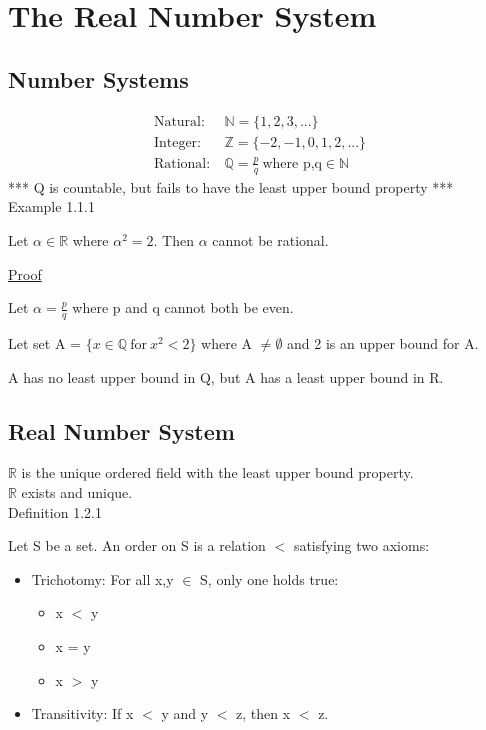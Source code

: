 \newpage
\section[Day 1: The Real Number System]{The Real Number System}





\subsection{Number Systems}

\begin{align*}
	\text{Natural}:\ & \mathbb{N} = \{1, 2, 3, ... \} \\
	\text{Integer}:\ & \mathbb{Z} = \{-2, -1, 0, 1, 2, ... \} \\
	\text{Rational}:\ & \mathbb{Q} = \frac{p}{q} \ \text{where p,q} \in \mathbb{N}
\end{align*}
*** Q is countable, but fails to have the least upper bound property *** \\

{ \color{purple} Example 1.1.1 }

\qquad Let $ \alpha \in \mathbb{R} $ where $ \alpha^2 = 2 $. Then $ \alpha $ cannot be rational.

{ \color{magenta} \underline{Proof} }

Let $ \alpha = \frac{p}{q} $ where p and q cannot both be even.

Let set A = $\{ x \in \mathbb{Q} \ \text{for} \ x^2 < 2 \} $ where A $ \neq \emptyset $
and 2 is an upper bound for A.

A has no least upper bound in Q, but A has a least upper bound in R.





\subsection{Real Number System}

$ \mathbb{R} $ is the unique ordered field with the least upper bound property. \\
$ \mathbb{R} $ exists and unique. \\

{ \color{blue} Definition 1.2.1 }

\qquad Let S be a set. An order on S is a relation $<$ satisfying two axioms:

\begin{itemize}[leftmargin=2cm]
	\item { \color{lblue} Trichotomy}: For all x,y $ \in $ S, only one holds true:
		\begin{itemize}[leftmargin=2cm]
			\item x $<$ y
			\item x = y
			\item x $>$ y
		\end{itemize}
	\item { \color{lblue} Transitivity}: If x $<$ y and y $<$ z, then x $<$ z.
\end{itemize}

